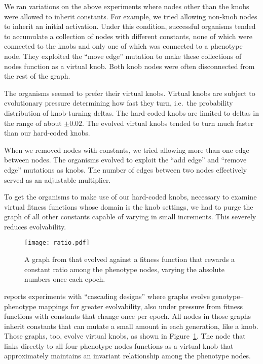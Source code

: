 \documentclass[letterpaper]{article}
\begin{document}
We ran variations on the above experiments where nodes other than the knobs were
allowed to inherit constants. For example, we tried allowing non-knob nodes to
inherit an initial activation. Under this condition, successful organisms tended
to accumulate a collection of nodes with different constants, none of which were
connected to the knobs and only one of which was connected to a phenotype node.
They exploited the ``move edge'' mutation to make these collections of nodes
function as a virtual knob. Both knob nodes were often disconnected from the
rest of the graph.

The organisms seemed to prefer their virtual knobs. Virtual knobs are subject to
evolutionary pressure determining how fast they turn, i.e.~the probability
distribution of knob-turning deltas. The hard-coded knobs are limited to deltas
in the range of about $\pm0.02$. The evolved virtual knobs tended to turn much
faster than our hard-coded knobs.

When we removed nodes with constants, we tried allowing more than one edge
between nodes. The organisms evolved to exploit the ``add edge'' and ``remove
edge'' mutations as knobs. The number of edges between two nodes effectively
served as an adjustable multiplier.

To get the organisms to make use of our hard-coded knobs, necessary to examine
virtual fitness functions whose domain is the knob settings, we had to purge
the graph of all other constants capable of varying in small increments. This
severely reduces evolvability.

\begin{figure}[b]
  \centering
  \texttt{[image: ratio.pdf]}
  \caption{A graph from \citet{kovitz2015experiments} that evolved against a
    fitness function that rewards a constant ratio among the phenotype nodes,
  varying the absolute numbers once each epoch.}
  \label{fig:virtual-knob}
\end{figure}

\citet{kovitz2015experiments} reports experiments with ``cascading designs''
where graphs evolve genotype--phenotype mappings for greater evolvability, also
under pressure from fitness functions with constants that change once per epoch.
All nodes in those graphs inherit constants that can mutate a small amount in
each generation, like a knob. Those graphs, too, evolve virtual knobs, as shown
in Figure~\ref{fig:virtual-knob}. The node that links directly to all four phenotype nodes functions
as a virtual knob that approximately maintains an invariant relationship
among the phenotype nodes.
\end{document}

